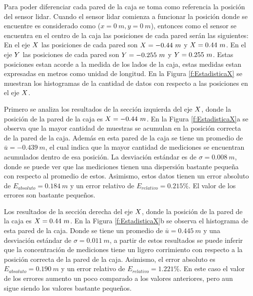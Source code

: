 Para poder diferenciar cada pared de la caja se toma como referencia la posición 
del sensor lidar. Cuando el sensor lidar comienza a funcionar la posición donde
se encuentre es considerado como ($x = 0~m, y = 0~m$), entonces como el sensor
se encuentra en el centro de la caja las posiciones de cada pared serán las 
siguientes: En el eje $\mathnormal X$ las posiciones de cada pared son $\mathnormal X = -0.44~m$ 
y $\mathnormal X = 0.44~m$. En el eje $\mathnormal Y$ las posiciones de cada pared son 
$\mathnormal Y = -0.255~m$ y $\mathnormal Y = 0.255~m$. Estas posiciones estan acorde a la medida
de los lados de la caja, estas medidas estan expresadas en metros como unidad 
de longitud. En la Figura \ref{f:EstadisticaX} se muestran los histogramas de 
la cantidad de datos con respecto a las posiciones en el eje $\mathnormal X$.

Primero se analiza los resultados de la sección izquierda del eje $\mathnormal X$, donde 
la posición de la pared de la caja es $\mathnormal X = -0.44~m$. En la Figura 
\ref{f:EstadisticaX}a se observa que la mayor cantidad de muestras se acumulan en 
la posición correcta de la pared de la caja. Además en esta pared de la caja se 
tiene un promedio de $\bar{u} = -0.439~m$, el cual indica que la mayor cantidad de 
mediciones se encuentran acumulados dentro de esa posición. La desviación estándar 
es de $\sigma = 0.008~m$, donde se puede ver que las mediciones tienen una dispersión 
bastante pequeña con respecto al promedio de estos. Asimismo, estos datos tienen un 
error absoluto de $E_{absoluto} = 0.184~m$ y un error relativo de $E_{relativo} = 
0.215\%$. El valor de los errores son bastante pequeños.

Los resultados de la sección derecha del eje $\mathnormal X$, donde la posición de la
pared de la caja es $\mathnormal X = 0.44~m$. En la Figura \ref{f:EstadisticaX}b se observa 
el histograma de esta pared de la caja. Donde se tiene un promedio de $\bar{u} = 0.445~m$ 
y una desviación estándar de $\sigma = 0.011~m$, a partir de estos resultados se puede 
inferir que la concentración de mediciones tiene un ligero corrimiento con respecto a 
la posición correcta de la pared de la caja. Asimismo, el error absoluto es 
$E_{absoluto} = 0.190~m$ y un error relativo de $E_{relativo} = 1.221\%$. En este caso
el valor de los errores aumento un poco comparado a los valores anteriores, pero aun 
sigue siendo los valores bastante pequeños.


